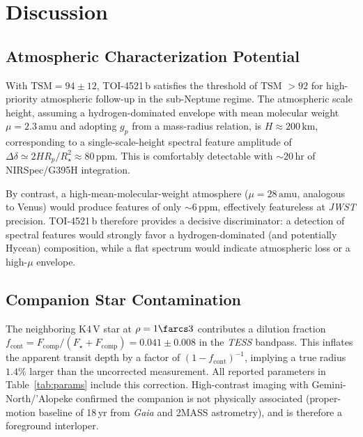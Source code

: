 \section{Discussion}
\label{sec:discussion}

\subsection{Atmospheric Characterization Potential}
\label{sec:atmos}

With $\mathrm{TSM} = 94 \pm 12$, TOI-4521\,b satisfies the
\citet{Kempton2018} threshold of TSM $> 92$ for high-priority
atmospheric follow-up in the sub-Neptune regime.  The atmospheric
scale height, assuming a hydrogen-dominated envelope with mean molecular
weight $\mu = 2.3\,\mathrm{amu}$ and adopting $g_p$ from a mass-radius
relation, is $H \approx 200\,\mathrm{km}$, corresponding to a
single-scale-height spectral feature amplitude of
$\Delta\delta \simeq 2H R_p / R_\star^2 \approx 80\,\mathrm{ppm}$.
This is comfortably detectable with $\sim 20\,\mathrm{hr}$ of NIRSpec/G395H
integration.

By contrast, a high-mean-molecular-weight atmosphere ($\mu = 28\,\mathrm{amu}$,
analogous to Venus) would produce features of only $\sim 6\,\mathrm{ppm}$,
effectively featureless at \textit{JWST} precision.  TOI-4521\,b therefore
provides a decisive discriminator: a detection of spectral features
would strongly favor a hydrogen-dominated (and potentially Hycean)
composition, while a flat spectrum would indicate atmospheric loss or
a high-$\mu$ envelope.

\subsection{Companion Star Contamination}
\label{sec:companion}

The neighboring K4\,V star at $\rho = 1\farcs3$ contributes a dilution
fraction $f_\mathrm{cont} = F_\mathrm{comp}/(F_\star + F_\mathrm{comp})
= 0.041 \pm 0.008$ in the \textit{TESS} bandpass.  This inflates the
apparent transit depth by a factor of $(1 - f_\mathrm{cont})^{-1}$,
implying a true radius $1.4\%$ larger than the uncorrected measurement.
All reported parameters in Table~\ref{tab:params} include this correction.
High-contrast imaging with Gemini-North/'Alopeke confirmed the companion
is not physically associated (proper-motion baseline of 18\,yr from
\textit{Gaia} and 2MASS astrometry), and is therefore a foreground
interloper.

